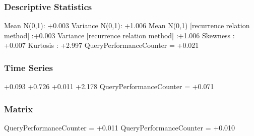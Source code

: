 \documentclass[9pt]{article}
\theoremstyle{plain}
\theoremstyle{definition}
\theoremstyle{remark}
\numberwithin{equation}{section}
\begin{document}
\subsubsection{Descriptive Statistics}
Mean N(0,1): +0.003
Variance N(0,1): +1.006
Mean N(0,1) [recurrence relation method] :+0.003
Variance [recurrence relation method] :+1.006
Skewness : +0.007
Kurtosis : +2.997
QueryPerformanceCounter  =  +0.021
\subsubsection{Time Series }
+0.093
+0.726
+0.011
+2.178
QueryPerformanceCounter  =  +0.071
\subsubsection{Matrix}
QueryPerformanceCounter  =  +0.011
QueryPerformanceCounter  =  +0.010
\end{document}
